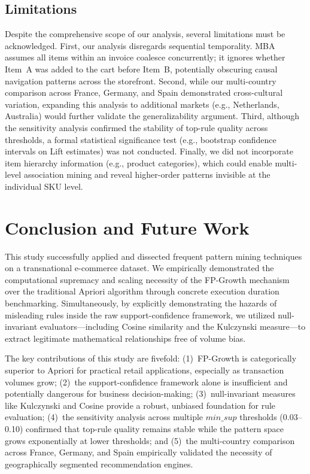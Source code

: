 \documentclass[conference]{IEEEtran}
\begin{document}
\subsection{Limitations}
Despite the comprehensive scope of our analysis, several limitations must be acknowledged. First, our analysis disregards sequential temporality. MBA assumes all items within an invoice coalesce concurrently; it ignores whether Item~A was added to the cart before Item~B, potentially obscuring causal navigation patterns across the storefront. Second, while our multi-country comparison across France, Germany, and Spain demonstrated cross-cultural variation, expanding this analysis to additional markets (e.g., Netherlands, Australia) would further validate the generalizability argument. Third, although the sensitivity analysis confirmed the stability of top-rule quality across thresholds, a formal statistical significance test (e.g., bootstrap confidence intervals on Lift estimates) was not conducted. Finally, we did not incorporate item hierarchy information (e.g., product categories), which could enable multi-level association mining and reveal higher-order patterns invisible at the individual SKU level.

\section{Conclusion and Future Work}
This study successfully applied and dissected frequent pattern mining techniques on a transnational e-commerce dataset. We empirically demonstrated the computational supremacy and scaling necessity of the FP-Growth mechanism over the traditional Apriori algorithm through concrete execution duration benchmarking. Simultaneously, by explicitly demonstrating the hazards of misleading rules inside the raw support-confidence framework, we utilized null-invariant evaluators---including Cosine similarity and the Kulczynski measure---to extract legitimate mathematical relationships free of volume bias.

The key contributions of this study are fivefold: (1)~FP-Growth is categorically superior to Apriori for practical retail applications, especially as transaction volumes grow; (2)~the support-confidence framework alone is insufficient and potentially dangerous for business decision-making; (3)~null-invariant measures like Kulczynski and Cosine provide a robust, unbiased foundation for rule evaluation; (4)~the sensitivity analysis across multiple $min\_sup$ thresholds (0.03--0.10) confirmed that top-rule quality remains stable while the pattern space grows exponentially at lower thresholds; and (5)~the multi-country comparison across France, Germany, and Spain empirically validated the necessity of geographically segmented recommendation engines.
\end{document}
